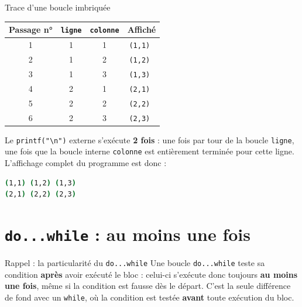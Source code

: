 \begin{UPSTIprofOnlyEnv}
    \begin{UPSTIcorrectionP}{Trace d'une boucle imbriquée}
        \begin{center}
            \begin{tabular}{|c|c|c|c|}
                \hline
                \textbf{Passage n°} & \texttt{ligne} & \texttt{colonne} & \textbf{Affiché} \\
                \hline
                1 & 1 & 1 & \texttt{(1,1) } \\
                \hline
                2 & 1 & 2 & \texttt{(1,2) } \\
                \hline
                3 & 1 & 3 & \texttt{(1,3) } \\
                \hline
                4 & 2 & 1 & \texttt{(2,1) } \\
                \hline
                5 & 2 & 2 & \texttt{(2,2) } \\
                \hline
                6 & 2 & 3 & \texttt{(2,3) } \\
                \hline
            \end{tabular}
        \end{center}
        Le \texttt{printf("\textbackslash n")} externe s'exécute \textbf{2 fois} : une fois par tour de la boucle \texttt{ligne}, une fois que la boucle interne \texttt{colonne} est entièrement terminée pour cette ligne.
        L'affichage complet du programme est donc :
        \begin{lstlisting}[language=bash,style=console]
(1,1) (1,2) (1,3)
(2,1) (2,2) (2,3)
\end{lstlisting}
    \end{UPSTIcorrectionP}
\end{UPSTIprofOnlyEnv}


\section{\texttt{do...while} : au moins une fois}

\begin{UPSTIinfor}{Rappel : la particularité du \texttt{do...while}}
    Une boucle \texttt{do...while} teste sa condition \textbf{après} avoir exécuté le bloc : celui-ci s'exécute donc toujours \textbf{au moins une fois}, même si la condition est fausse dès le départ. C'est la seule différence de fond avec un \texttt{while}, où la condition est testée \textbf{avant} toute exécution du bloc.
\end{UPSTIinfor}

